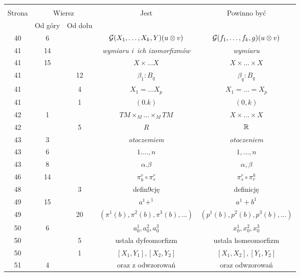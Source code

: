 \documentclass[a4paper,11pt]{article}
\begin{document}
\begin{center}
  \begin{tabular}{|c|c|c|c|c|}
    \hline
    & \multicolumn{2}{c|}{} & & \\
    Strona & \multicolumn{2}{c|}{Wiersz} & Jest
                              & Powinno być \\ \cline{2-3}
    & Od góry & Od dołu & & \\
    \hline
    40  &  6 & & $\mathcal{G}( X_{ 1 }, \ldots, X_{ k }, Y )( u \otimes v )$
           & $\mathcal{G}( f_{ 1 }, \ldots, f_{ k }, g )( u \otimes v )$ \\
    41  & 14 & & \textit{wymiaru i~ich izomorfizmów} & \textit{wymiaru} \\
    41  & 15 & & $X \times \ldots X$ & $X \times \ldots \times X$ \\
    41  & & 12 & $\beta_{ 1 } : B_{ q }$ & $\beta_{ q } : B_{ q }$ \\
    41  & &  4 & $X_{ 1 } = \ldots X_{ p }$
           & $X_{ 1 } = \ldots = X_{ p }$ \\
    41  & &  1 & $( 0. k )$ & $( 0, k )$ \\
    42  &  1 & & $TM \times_{ M } \ldots \times_{ M } TM$ & $X \times \ldots \times X$ \\
    42  & &  5 & $R$ & $\mathbb{R}$ \\
    43  &  3 & & \textit{otoczemiem} & \textit{otoczeniem} \\
    43  &  6 & & $1 . \ldots, n$ & $1, \ldots, n$ \\
    43  &  8 & & $\alpha. \beta$ & $\alpha, \beta$ \\
    46  & 14 & & $\pi_{ k }^{ r } \circ \pi^{ r }_{ s }$
           & $\pi_{ s }^{ r } \circ \pi^{ k }_{ r }$ \\
    48  & &  3 & defin9cję & definicję \\
    49  & 15 & & $a^{ 1 } + ^{ 1 }$ & $a^{ 1 } + b^{ 1 }$ \\
    49  & & 20 & $( \pi^{ 1 } ( b ), \pi^{ 2 } ( b ), \pi^{ 3 } ( b ), \ldots )$
           & $( p^{ 1 } ( b ), p^{ 2 } ( b ), p^{ 3 } ( b ), \ldots )$ \\
    50  &  6 & & $a_{ 0 }^{ 1 }, a_{ 0 }^{ 2 }, a_{ 0 }^{ 3 }$
           & $x_{ 0 }^{ 1 }, x_{ 0 }^{ 2 }, x_{ 0 }^{ 3 }$ \\
    50  & &  5 & ustala dyfeomorfizm & ustala homeomorfizm \\
    50  & & 1 & $[ X_{ 1 }, Y_{ 1 }], [ X_{ 2 }, Y_{ 2 } ]$
           & $[ X_{ 1 }, X_{ 2 }], [ Y_{ 1 }, Y_{ 2 } ]$ \\
    51  &  4 & & oraz z odwzorowań & oraz odwzorowań \\

\end{tabular}
\end{center}
\end{document}
